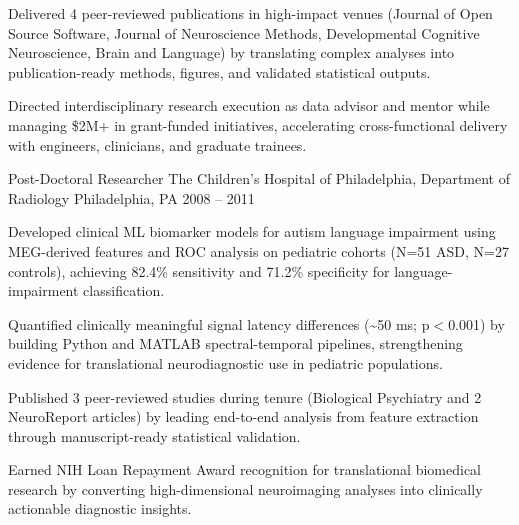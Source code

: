 \begin{cventries}
{\begin{cvitems}
        \item Delivered 4 peer-reviewed publications in high-impact venues (Journal of Open Source Software, Journal of Neuroscience Methods, Developmental Cognitive Neuroscience, Brain and Language) by translating complex analyses into publication-ready methods, figures, and validated statistical outputs.
        \item Directed interdisciplinary research execution as data advisor and mentor while managing \$2M+ in grant-funded initiatives, accelerating cross-functional delivery with engineers, clinicians, and graduate trainees.
      \end{cvitems}
    }
  \cventry
    {Post-Doctoral Researcher}
    {The Children's Hospital of Philadelphia, Department of Radiology}
    {Philadelphia, PA}
    {2008 -- 2011}
    {
      \begin{cvitems}
        \item Developed clinical ML biomarker models for autism language impairment using MEG-derived features and ROC analysis on pediatric cohorts (N=51 ASD, N=27 controls), achieving 82.4\% sensitivity and 71.2\% specificity for language-impairment classification.
        \item Quantified clinically meaningful signal latency differences (\textasciitilde50 ms; p$<$0.001) by building Python and MATLAB spectral-temporal pipelines, strengthening evidence for translational neurodiagnostic use in pediatric populations.
        \item Published 3 peer-reviewed studies during tenure (Biological Psychiatry and 2 NeuroReport articles) by leading end-to-end analysis from feature extraction through manuscript-ready statistical validation.
        \item Earned NIH Loan Repayment Award recognition for translational biomedical research by converting high-dimensional neuroimaging analyses into clinically actionable diagnostic insights.
      \end{cvitems}
    }

\end{cventries}
